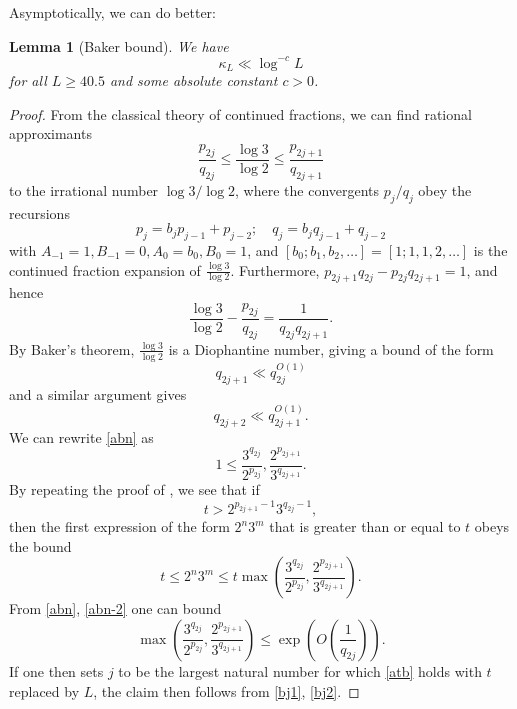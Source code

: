 \documentclass[12pt,a4paper,reqno]{amsart}
\numberwithin{equation}{section}
\theoremstyle{plain}
\newtheorem{lemma}[theorem]{Lemma}
\theoremstyle{definition}
\begin{document}
Asymptotically, we can do better:

\begin{lemma}[Baker bound]\label{baker} We have
  $$ \kappa_L \ll \log^{-c} L$$
for all $L \geq 40.5$ and some absolute constant $c>0$.
\end{lemma}

\begin{proof}  From the classical theory of continued fractions, we can find rational approximants
\begin{equation}\label{abn}
 \frac{p_{2j}}{q_{2j}} \leq \frac{\log 3}{\log 2} \leq \frac{p_{2j+1}}{q_{2j+1}}
\end{equation}
to the irrational number $\log 3/\log 2$, where the convergents $p_j/q_j$ obey the recursions
$$ p_j = b_j p_{j-1} + p_{j-2}; \quad q_j = b_j q_{j-1} + q_{j-2}$$
with $A_{-1} = 1, B_{-1}=0, A_0 = b_0, B_0=1$, and $[b_0;b_1,b_2,\dots] = [1;1,1,2,\dots]$ is the continued fraction expansion of $\frac{\log 3}{\log 2}$.  Furthermore, $p_{2j+1}q_{2j} - p_{2j} q_{2j+1} = 1$, and hence
\begin{equation}\label{abn-2} 
  \frac{\log 3}{\log 2} - \frac{p_{2j}}{q_{2j}} = \frac{1}{q_{2j} q_{2j+1}}.
\end{equation}
By Baker's theorem, $\frac{\log 3}{\log 2}$ is a Diophantine number, giving a bound of the form
\begin{equation}\label{bj1}
   q_{2j+1} \ll q_{2j}^{O(1)}
\end{equation}
and a similar argument gives
\begin{equation}\label{bj2}
 q_{2j+2} \ll q_{2j+1}^{O(1)}.
\end{equation}
We can rewrite \eqref{abn} as
$$ 1 \leq \frac{3^{q_{2j}}}{2^{p_{2j}}}, \frac{2^{p_{2j+1}}}{3^{q_{2j+1}}}.$$
By repeating the proof of , we see that if
\begin{equation}\label{atb}
   t > 2^{p_{2j+1}-1} 3^{q_{2j}-1},
\end{equation}
then the first expression of the form $2^n 3^m$ that is greater than or equal to $t$ obeys the bound
$$ t \leq 2^n 3^m \leq t \max\left( \frac{3^{q_{2j}}}{2^{p_{2j}}}, \frac{2^{p_{2j+1}}}{3^{q_{2j+1}}} \right).$$
From \eqref{abn},  \eqref{abn-2} one can bound
$$ \max\left( \frac{3^{q_{2j}}}{2^{p_{2j}}}, \frac{2^{p_{2j+1}}}{3^{q_{2j+1}}} \right) \leq \exp\left( O\left( \frac{1}{q_{2j}}\right)\right).$$
If one then sets $j$ to be the largest natural number for which \eqref{atb} holds with $t$ replaced by $L$, the claim then follows from \eqref{bj1}, \eqref{bj2}.
\end{proof}
\end{document}
